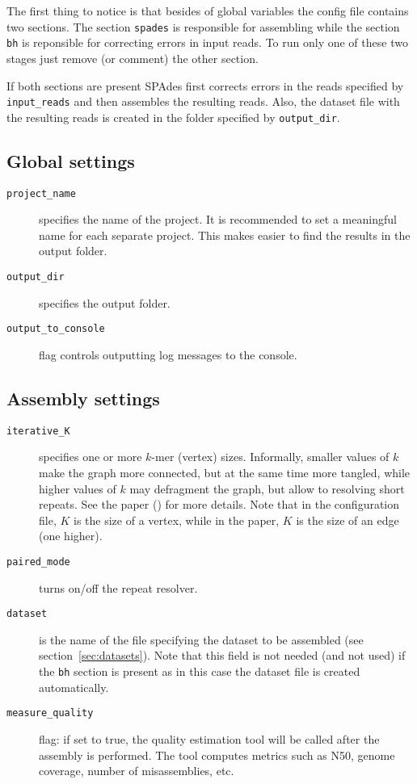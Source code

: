 \documentclass{article}
\def\spades{SPAdes}
\begin{document}
The first thing to notice is that besides of global variables the config file contains two sections. The section {\tt spades} is responsible for assembling
while the section {\tt bh} is reponsible for correcting errors in input reads.
To run only one of these two stages just remove (or comment) the other section.

If both sections are present {\spades} first corrects errors in the reads specified by {\tt input\_reads} and then assembles the resulting reads. Also, the dataset file
with the resulting reads is created in the folder specified by {\tt output\_dir}.

\subsection{Global settings}

\begin{description}
\item[{\tt project\_name}] specifies the name of the project. It is recommended to set a meaningful name for each separate project. This makes easier to find the results in the output folder.
\item[{\tt output\_dir}] specifies the output folder.
\item[{\tt output\_to\_console}] flag controls outputting log messages to the console.
\end{description}

\subsection{Assembly settings}
\begin{description}
\item[{\tt iterative\_K}] specifies one or more $k$-mer (vertex) sizes.  Informally, smaller values of $k$ make the graph more connected, but at the same time more tangled, while higher values of $k$ may defragment the graph, but allow to resolving short repeats. See the paper (\cite{main}) for more details.  Note that in the configuration file, $K$ 
is the size of a vertex, while in the paper, $K$ is the size of an edge (one higher).

\item[{\tt paired\_mode}] turns on/off the repeat resolver.

\item[{\tt dataset}] is the name of the file specifying the dataset to be assembled
(see section~\ref{sec:datasets}). Note that this field is not needed (and not used)
if the {\tt bh} section is present as in this case the dataset file is created automatically.

\item[{\tt measure\_quality}] flag: if set to true, the quality estimation tool will be called after the assembly is performed.  The tool computes metrics such as N50, genome coverage, number of misassemblies, etc.
\end{description}
\end{document}
